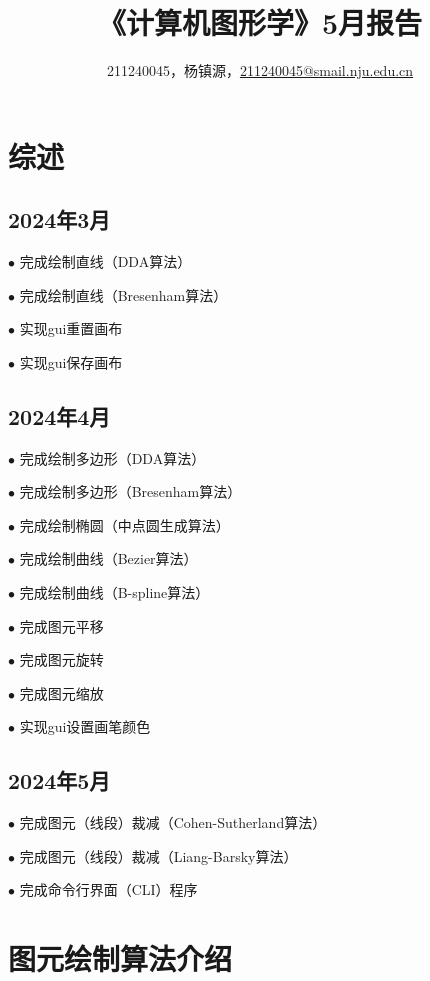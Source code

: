 \documentclass[a4paper,UTF8]{article}
\theoremstyle{definition}
\begin{document}
\title{\textbf{《计算机图形学》5月报告}}
\author{211240045，杨镇源，\href{mailto:211240045@smail.nju.edu.cn}{211240045@smail.nju.edu.cn}}
\maketitle
\tableofcontents 
\newpage
\section{综述}

\subsection{2024年3月}

$\bullet$ 完成绘制直线（DDA算法）

$\bullet$ 完成绘制直线（Bresenham算法）

$\bullet$ 实现gui重置画布

$\bullet$ 实现gui保存画布

\subsection{2024年4月}

$\bullet$ 完成绘制多边形（DDA算法）

$\bullet$ 完成绘制多边形（Bresenham算法）

$\bullet$ 完成绘制椭圆（中点圆生成算法）

$\bullet$ 完成绘制曲线（Bezier算法）

$\bullet$ 完成绘制曲线（B-spline算法）

$\bullet$ 完成图元平移

$\bullet$ 完成图元旋转

$\bullet$ 完成图元缩放

$\bullet$ 实现gui设置画笔颜色

\subsection{2024年5月}

$\bullet$ 完成图元（线段）裁减（Cohen-Sutherland算法）

$\bullet$ 完成图元（线段）裁减（Liang-Barsky算法）

$\bullet$ 完成命令行界面（CLI）程序

\section{图元绘制算法介绍}
\end{document}
